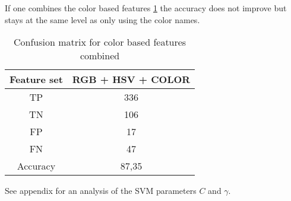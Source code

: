 If one combines the color based features \cref{table:color_features} the accuracy does not improve but stays at the same level as only using the color names. 

\FloatBarrier
\begin{table}[h!]
	\begin{center}
		\caption{Confusion matrix for color based features combined}
		\begin{tabular}{|c|c|}
			\hline
			Feature set & RGB + HSV + COLOR \\ \hline
			    TP      &    336    \\ \hline
			    TN      &    106     \\ \hline
			    FP      &    17     \\ \hline
			    FN      &    47     \\ \hline
			 Accuracy   &   87,35   \\ \hline
		\end{tabular}
		
		\label{table:color_features}
	\end{center}
\end{table}
\FloatBarrier

See appendix for an analysis of the SVM parameters $C$ and $\gamma$.





